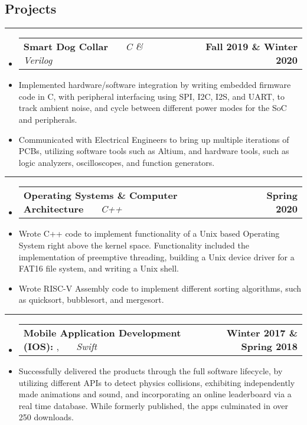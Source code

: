 \documentclass[10pt,letterpaper]{article}
\makeatletter
\newcommand{\header}[2]
{
	\begin{tabular*}{\linewidth}{l @{\extracolsep{\fill}} r}
		\hspace{-27pt} #1 & #2 \\
	\end{tabular*}
}
\newcommand{\sectionbreak}
{
	\vspace{-1.2em}
	\rule{\textwidth}{1.7pt}
	\vspace{-1.7em}
}
\makeatother
\begin{document}
\vspace{-1.5em}

\subsection*{Projects}
\sectionbreak


\begin{itemize}
	\item[]
		\header
		{
			\textbf{Smart Dog Collar}
			\emph{\smash{Senior Design Project}} \ \ \ \footnotesize \emph{C \& Verilog}
		}
			{\textbf{Fall 2019 \& Winter 2020}}
		\item 
			Implemented hardware/software integration by writing embedded firmware code in C, with peripheral interfacing using SPI, I2C, I2S, and UART, to track ambient noise, and cycle between different power modes for the SoC and peripherals.
		\item 
			Communicated with Electrical Engineers to bring up multiple iterations of PCBs, utilizing software tools such as Altium, and hardware tools, such as logic analyzers, oscilloscopes, and function generators.

\end{itemize}

\hrule

\begin{itemize}
	\item[]
		\header
		{
			\textbf{Operating Systems \& Computer Architecture}
			\emph{\smash{Relevant Course Projects}} \ \ \ \footnotesize \emph{C++}
		}
			{\textbf{Spring 2020}}
		\item 
			Wrote C++ code to implement functionality of a Unix based Operating System right above the kernel space. Functionality included the implementation of preemptive threading, building a Unix device driver for a FAT16 file system, and writing a Unix shell.
		\item 
			Wrote RISC-V Assembly code to implement different sorting algorithms, such as quicksort, bubblesort, and mergesort. 

\end{itemize}
\hrule
\begin{itemize}
	\item[]
		\header
		{
			\textbf{Mobile Application Development (IOS): }
			\href{https://appadvice.com/app/round-bound/1369632746}{\emph{\underline{\smash{Round 'a Bound}}}}, 
			\href{https://appadvice.com/app/tic-tac-emoji/1346934986}{\emph{\underline{\smash{Tic-Tac Emoji}}}} \ \ \ \footnotesize  \emph{Swift}
		}
			{\textbf{Winter 2017 \& Spring 2018}}
		\item 
			Successfully delivered the products through the full software lifecycle, by utilizing different APIs to detect physics collisions, exhibiting independently made animations and sound, and incorporating an online leaderboard via a real time database. While formerly published, the apps culminated in over 250 downloads.
\end{itemize}
\end{document}
